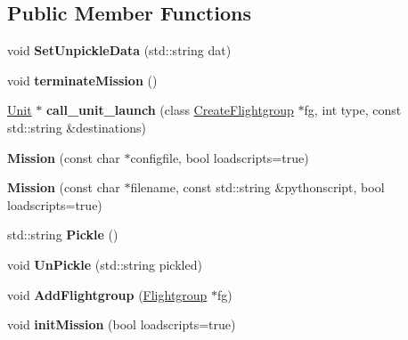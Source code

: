 \subsection*{Public Member Functions}
\begin{DoxyCompactItemize}
\item 
void {\bfseries Set\+Unpickle\+Data} (std\+::string dat)\hypertarget{classMission_abe34e56a59560161545b3d7155ef6184}{}\label{classMission_abe34e56a59560161545b3d7155ef6184}

\item 
void {\bfseries terminate\+Mission} ()\hypertarget{classMission_aed716cda86a8f49c9da24d9f855ad99b}{}\label{classMission_aed716cda86a8f49c9da24d9f855ad99b}

\item 
\hyperlink{classUnit}{Unit} $\ast$ {\bfseries call\+\_\+unit\+\_\+launch} (class \hyperlink{classCreateFlightgroup}{Create\+Flightgroup} $\ast$fg, int type, const std\+::string \&destinations)\hypertarget{classMission_ab97f29a0ca707c6f1b08f5986b24f9a3}{}\label{classMission_ab97f29a0ca707c6f1b08f5986b24f9a3}

\item 
{\bfseries Mission} (const char $\ast$configfile, bool loadscripts=true)\hypertarget{classMission_aca7e9635ca776d2e6631fc250419ad4d}{}\label{classMission_aca7e9635ca776d2e6631fc250419ad4d}

\item 
{\bfseries Mission} (const char $\ast$filename, const std\+::string \&pythonscript, bool loadscripts=true)\hypertarget{classMission_a8afbb9dfaed9f630969e17717944b02b}{}\label{classMission_a8afbb9dfaed9f630969e17717944b02b}

\item 
std\+::string {\bfseries Pickle} ()\hypertarget{classMission_a9c1e7bd70b5107a332b0397b1b43042b}{}\label{classMission_a9c1e7bd70b5107a332b0397b1b43042b}

\item 
void {\bfseries Un\+Pickle} (std\+::string pickled)\hypertarget{classMission_a568181b17ec0a39ccba287a8909bd6a4}{}\label{classMission_a568181b17ec0a39ccba287a8909bd6a4}

\item 
void {\bfseries Add\+Flightgroup} (\hyperlink{classFlightgroup}{Flightgroup} $\ast$fg)\hypertarget{classMission_a62e5a6c173b88bd1e8691cc89ca42ed8}{}\label{classMission_a62e5a6c173b88bd1e8691cc89ca42ed8}

\item 
void {\bfseries init\+Mission} (bool loadscripts=true)\hypertarget{classMission_a74e48ae8f09db6f8481f92e745adabf9}{}\label{classMission_a74e48ae8f09db6f8481f92e745adabf9}


\end{DoxyCompactItemize}
